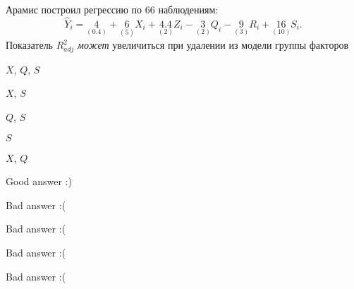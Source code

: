 
\begin{question}
Арамис построил регрессию по 66 наблюдениям:
\[
\hat Y_i = \underset{(0.4)}{4} + \underset{(5)}{6}X_i + \underset{(2)}{4.4} Z_i - \underset{(2)}{3} Q_i - \underset{(3)}{9} R_i + \underset{(10)}{16} S_i.
\]
Показатель \(R^2_{adj}\) \emph{может} увеличиться при удалении из модели группы факторов
\begin{answerlist}
  \item \(X\), \(Q\), \(S\)
  \item \(X\), \(S\)
  \item \(Q\), \(S\)
  \item \(S\)
  \item \(X\), \(Q\)
\end{answerlist}
\end{question}

\begin{solution}
\begin{answerlist}
  \item Good answer :)
  \item Bad answer :(
  \item Bad answer :(
  \item Bad answer :(
  \item Bad answer :(
\end{answerlist}
\end{solution}

